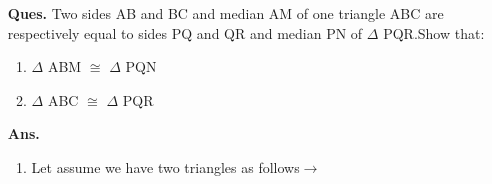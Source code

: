 \renewcommand{\thefigure}{\arabic{section}.\arabic{subsection}.\arabic{figure}}

\begin{enumerate}
		\item[\textbf{Ques.}] 
		{ Two sides AB and BC and median AM of one
		triangle ABC are respectively equal to sides PQ
		and QR and median PN of $\Delta$ PQR.Show that:}

	\begin{enumerate}
		\item$\Delta$ ABM $\cong$ $\Delta$ PQN  
		\item$\Delta$ ABC $\cong$ $\Delta$ PQR
	\end{enumerate}
	
	\item [\textbf{Ans.}]

	\begin{enumerate}
		\item Let assume we have two triangles as follows$\to$\\
		

\end{enumerate}
\end{enumerate}
